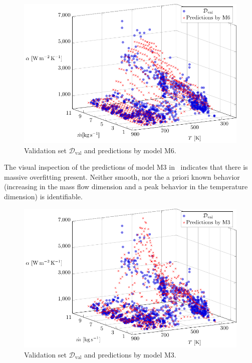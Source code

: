 \begin{figure}[H]
	\centering
	\includegraphics[width=\columnwidth]{graphics/pgfplots/cha5/Ebner/M6.pdf}
	\caption{Validation set $\mathcal{D}_{\text{val}}$ and predictions by model M6.}
	\label{fig:ebner-M6}
\end{figure}
%
The visual inspection of the predictions of model M3 in~ indicates that there is massive overfitting present. Neither smooth, nor the a priori known behavior (increasing in the mass flow dimension and a peak behavior in the temperature dimension) is identifiable.  

\begin{figure}[H]
	\centering
	\includegraphics[width=\columnwidth]{graphics/pgfplots/cha5/Ebner/M3.pdf}
	\caption{Validation set $\mathcal{D}_{\text{val}}$ and predictions by model M3.}
	\label{fig:ebner-M3}
\end{figure}

